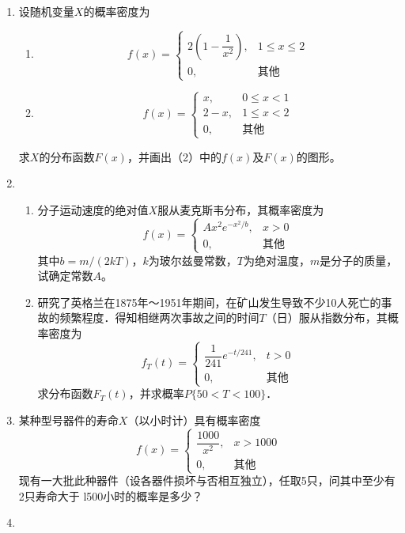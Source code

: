 \documentclass[10pt,a4paper]{article}
\begin{document}
\begin{enumerate}
    \item 设随机变量$X$的概率密度为
    \begin{enumerate}
        \item $$
            f(x)=\left\{\begin{array}{ll}
                2(1-\dfrac{1}{x^2}), & 1\leq x\leq 2\\
                0, & \mbox{其他} 
            \end{array}\right.
        $$
        \item $$
        f(x)=\left\{\begin{array}{ll}
            x, & 0\leq x <1\\
            2-x, & 1\leq x <2\\
            0, & \mbox{其他} 
        \end{array}\right.
        $$
    \end{enumerate}
    求$X$的分布函数$F(x)$，并画出（2）中的$f(x)$及$F(x)$的图形。

    \item \begin{enumerate}
        \item 分子运动速度的绝对值$X$服从麦克斯韦分布，其概率密度为
        $$f(x)=\left\{\begin{array}{ll}
            Ax^2e^{-x^2/b}, & x>0\\
            0, & \mbox{其他}
        \end{array}\right.$$
        其中$b=m/(2kT)$，$k$为玻尔兹曼常数，$T$为绝对温度，$m$是分子的质量，试确定常数$A$。
        \item 研究了英格兰在1875年～1951年期间，在矿山发生导致不少10人死亡的事
        故的频繁程度．得知相继两次事故之间的时间$T$（日）服从指数分布，其概率密度为
        $$f_T(t)=\left\{\begin{array}{ll}
            \dfrac{1}{241}e^{-t/241}, & t>0\\
            0, & \mbox{其他}
        \end{array}\right.$$
        求分布函数$F_T(t)$，并求概率$P\{50<T<100\}$．
    \end{enumerate}
    

    \item 某种型号器件的寿命$X$（以小时计）具有概率密度
    $$f(x)=\left\{\begin{array}{ll}
        \dfrac{1000}{x^2}, & x>1000\\
        0, & \mbox{其他}
    \end{array}\right.$$
    现有一大批此种器件（设各器件损坏与否相互独立），任取5只，问其中至少有2只寿命大于
    l500小时的概率是多少？


    \item 



    

\end{enumerate}
\end{document}
